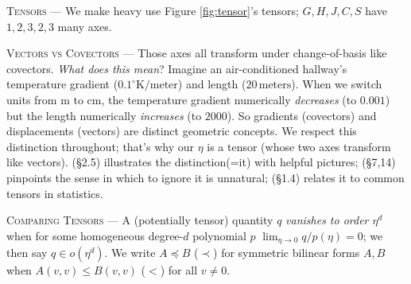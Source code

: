 
            \textsc{Tensors} --- We make heavy use Figure \ref{fig:tensor}'s tensors;
            $G, H, J, C, S$ have $1, 2, 3, 2, 3$ many axes.%

            \textsc{Vectors vs Covectors} --- 
                Those axes all transform under change-of-basis like covectors.
                \emph{What does this mean}?  Imagine an air-conditioned
                hallway's temperature gradient ($0.1^\circ
                \text{K}/\text{meter}$) and length ($20\,\text{meters}$).
                When we switch units from m to cm, the temperature
                gradient numerically \emph{decreases} (to $0.001$) but the length
                numerically \emph{increases} (to $2000$).  So gradients
                (covectors) and displacements (vectors) are distinct geometric
                concepts.  We respect this distinction throughout; that's why our $\eta$ is a tensor (whose two
                axes transform like vectors).
                \cite{mi73} (\S2.5) illustrates the distinction(=it) with
                helpful pictures; \cite{ko93} (\S7,14) pinpoints the sense in
                which to ignore it is unnatural; \cite{cu87} (\S1.4) relates
                it to common tensors in statistics.

            \textsc{Comparing Tensors} --- A (potentially tensor)
            quantity $q$ \emph{vanishes to order $\eta^d$} when
            for some homogeneous degree-$d$ polynomial $p$
            $\lim_{\eta\to 0} q/p(\eta) = 0$; we then say $q\in o(\eta^d)$.
            We write $A \preceq B$ ($\prec$) for symmetric bilinear forms $A,
            B$ when $A(v,v) \leq B(v,v)$ ($<$) for all $v\neq 0$. 

